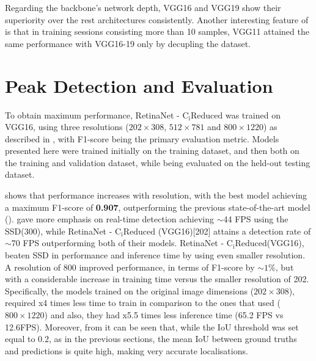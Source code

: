 Regarding the backbone's network depth, VGG16 and VGG19 show their superiority over the rest architectures consistently. Another interesting feature of  is that in training sessions consisting more than 10 samples, VGG11 attained the same performance with VGG16-19 only by decupling the dataset.

\section{Peak Detection and Evaluation}
To obtain maximum performance, RetinaNet - $\text{C}_\text{i}\text{Reduced}$ was trained on VGG16, using three resolutions ($202\times308$, $512\times781$ and $800\times1220$) as described in , with F1-score being the primary evaluation metric. Models presented here were trained initially on the training dataset, and then both on the training and validation dataset, while being evaluated on the held-out testing dataset.

 shows that performance increases with resolution, with the best model achieving a maximum F1-score of \textbf{0.907}, outperforming the previous state-of-the-art model (\cite{bargoti2017deep}). \cite{liang2018apple} gave more emphasis on real-time detection achieving $\sim$44 FPS using the SSD(300), while RetinaNet - $\text{C}_\text{i}\text{Reduced}$ (VGG16)[202] attains a detection rate of $\sim$70 FPS outperforming both of their models. RetinaNet - $\text{C}_\text{i}\text{Reduced}$(VGG16), beaten SSD in performance and inference time by using even smaller resolution. A resolution of 800 improved performance, in terms of F1-score by $\sim1\%$, but with a considerable increase in training time versus the smaller resolution of 202. Specifically, the models trained on the original image dimensions ($202\times308$), required x4 times less time to train in comparison to the ones that used ($800\times1220$) and also, they had x5.5 times less inference time (65.2 FPS vs 12.6FPS).
Moreover, from  it can be seen that, while the IoU threshold was set equal to 0.2, as in the previous sections, the mean IoU between ground truths and predictions is quite high, making very accurate localisations.

